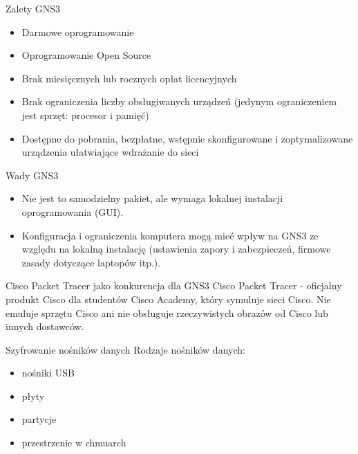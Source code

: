 \documentclass{beamer}
\begin{document}
\begin{frame}{Zalety GNS3}
    \begin{itemize}
        \item Darmowe oprogramowanie
        \item Oprogramowanie Open Source
        \item Brak miesięcznych lub rocznych opłat licencyjnych
        \item Brak ograniczenia liczby obsługiwanych urządzeń (jedynym ograniczeniem jest sprzęt: procesor i pamięć)
        \item Dostępne do pobrania, bezpłatne, wstępnie skonfigurowane i zoptymalizowane urządzenia ułatwiające wdrażanie do sieci
    \end{itemize}
\end{frame}

\begin{frame}{Wady GNS3}
    \begin{itemize}
        \item Nie jest to samodzielny pakiet, ale wymaga lokalnej instalacji oprogramowania (GUI).
        \item Konfiguracja i ograniczenia komputera mogą mieć wpływ na GNS3 ze względu na lokalną instalację (ustawienia zapory i zabezpieczeń, firmowe zasady dotyczące laptopów itp.).
    \end{itemize}
\end{frame}

\begin{frame}{Cisco Packet Tracer jako konkurencja dla GNS3}
    Cisco Packet Tracer - oficjalny produkt Cisco dla studentów Cisco Academy, który symuluje sieci Cisco. Nie emuluje sprzętu Cisco ani nie obsługuje rzeczywistych obrazów od Cisco lub innych dostawców.
\end{frame}

\begin{frame}{Szyfrowanie nośników danych}
     Rodzaje nośników danych:\\
     \begin{itemize}
         \item nośniki USB
        \item płyty
        \item partycje
        \item przestrzenie w chmuarch
     \end{itemize}
   
\end{frame}
\end{document}
